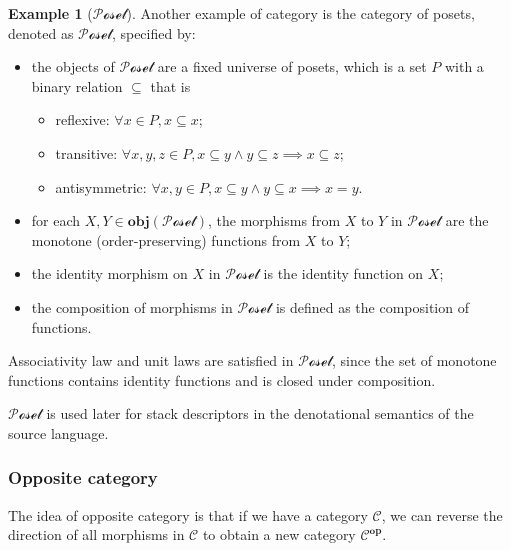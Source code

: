 \documentclass[12pt,twoside,a4paper]{report}
\theoremstyle{definition}
\theoremstyle{definition}
\theoremstyle{definition}
\newtheorem{example}{Example}
\theoremstyle{definition}
\begin{document}
        \begin{example}[$\mathcal{Poset}$]
            Another example of category is the category of posets, denoted as $\mathcal{Poset}$, specified by:
            \begin{itemize}
                \item 
                    the objects of $\mathcal{Poset}$ are a fixed universe of posets, which is a set $P$ with a binary relation $\subseteq$ that is 
                    \begin{itemize}
                        \item reflexive: $\forall x \in P, x \subseteq x$;
                        \item transitive: $\forall x, y, z \in P, x \subseteq y \land y \subseteq z \implies x \subseteq z$;
                        \item antisymmetric: $\forall x, y \in P, x \subseteq y \land y \subseteq x \implies x = y$.
                    \end{itemize}
                \item
                    for each $X, Y \in \textbf{obj}(\mathcal{Poset})$, the morphisms from $X$ to $Y$ in $\mathcal{Poset}$ are the monotone (order-preserving) functions from $X$ to $Y$;
                \item
                    the identity morphism on $X$ in $\mathcal{Poset}$ is the identity function on $X$;
                \item
                    the composition of morphisms in $\mathcal{Poset}$ is defined as the composition of functions.
            \end{itemize}
            Associativity law and unit laws are satisfied in $\mathcal{Poset}$, since the set of monotone functions contains identity functions and is closed under composition.

            $\mathcal{Poset}$ is used later for stack descriptors in the denotational semantics of the source language.
        \end{example}

            \subsubsection{Opposite category}
            The idea of opposite category is that if we have a category $\mathcal{C}$, we can reverse the direction of all morphisms in $\mathcal{C}$ to obtain a new category $\mathcal{C}^{\textbf{op}}$.
\end{document}
